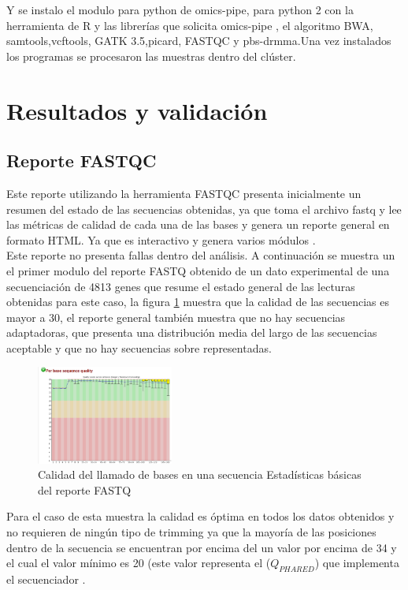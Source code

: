 {	Y se instalo el modulo para python de omics-pipe, para python 2 con la herramienta de R y las librerías que solicita omics-pipe\cite{Fisch2015} , el algoritmo BWA, samtools,vcftools, GATK 3.5,picard, FASTQC y pbs-drmma.Una vez instalados los programas se procesaron las muestras dentro del clúster.  


\section{Resultados y validación}
	\subsection*{Reporte FASTQC}}

Este reporte utilizando la herramienta FASTQC presenta inicialmente un resumen del estado de las secuencias obtenidas, ya que toma el archivo fastq y lee las métricas de calidad de cada una de las bases y genera un reporte general en formato HTML. Ya que es interactivo y genera varios módulos \cite{Babraham2016}. \\

Este reporte no presenta fallas dentro del análisis. A continuación se muestra un el primer modulo del reporte FASTQ obtenido de un dato experimental de una secuenciación de 4813 genes que resume el estado general de las lecturas obtenidas para este caso, la figura \ref{fig:fastq2} muestra que la calidad de las secuencias es mayor a 30, el reporte general también muestra que no hay secuencias adaptadoras, que presenta una distribución media del largo de las secuencias aceptable y que no hay secuencias sobre representadas.  \\

\begin{figure}[H]
	\centering
	\includegraphics[width=0.4\textwidth]{Kap2/fastq2}
	\caption{Calidad del llamado de bases en una secuencia Estadísticas básicas del reporte FASTQ} \label{fig:fastq2}
\end{figure}

Para el caso de esta muestra la calidad es óptima en todos los datos obtenidos y no requieren de ningún tipo de trimming ya que la mayoría de las posiciones dentro de la secuencia se encuentran por encima del un valor por encima de 34 y el cual el valor mínimo es 20 (este valor representa el ($Q_{PHARED}$) que implementa el secuenciador \cite{Babraham2016}. \\ 

